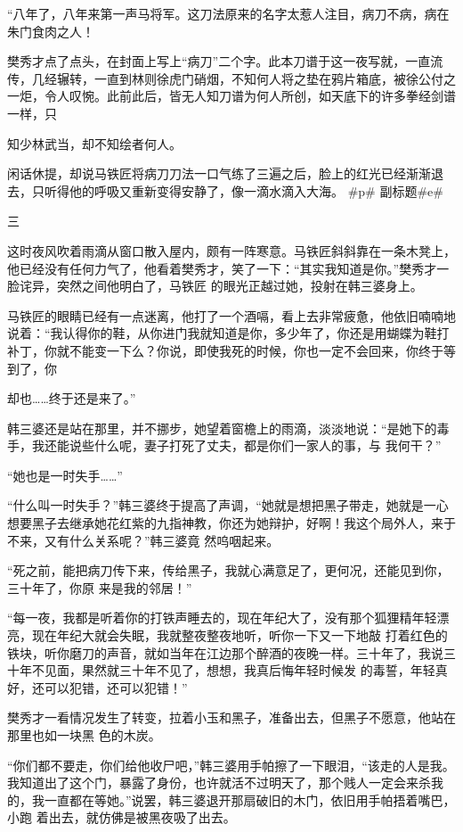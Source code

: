 \documentclass{article}
\begin{document}
“八年了，八年来第一声马将军。这刀法原来的名字太惹人注目，病刀不病，病在朱门食肉之人！

樊秀才点了点头，在封面上写上“病刀”二个字。此本刀谱于这一夜写就，一直流传，几经辗转，一直到林则徐虎门硝烟，不知何人将之垫在鸦片箱底，被徐公付之一炬，令人叹惋。此前此后，皆无人知刀谱为何人所创，如天底下的许多拳经剑谱一样，只
\newpage

知少林武当，却不知绘者何人。 

闲话休提，却说马铁匠将病刀刀法一口气练了三遍之后，脸上的红光已经渐渐退去，只听得他的呼吸又重新变得安静了，像一滴水滴入大海。 #p#
副标题#e# 


三 

这时夜风吹着雨滴从窗口散入屋内，颇有一阵寒意。马铁匠斜斜靠在一条木凳上，他已经没有任何力气了，他看着樊秀才，笑了一下：“其实我知道是你。”樊秀才一脸诧异，突然之间他明白了，马铁匠
的眼光正越过她，投射在韩三婆身上。 

马铁匠的眼睛已经有一点迷离，他打了一个酒嗝，看上去非常疲惫，他依旧喃喃地说着：“我认得你的鞋，从你进门我就知道是你，多少年了，你还是用蝴蝶为鞋打补丁，你就不能变一下么？你说，即使我死的时候，你也一定不会回来，你终于等到了，你

\newpage
却也……终于还是来了。” 

韩三婆还是站在那里，并不挪步，她望着窗檐上的雨滴，淡淡地说：“是她下的毒手，我还能说些什么呢，妻子打死了丈夫，都是你们一家人的事，与
我何干？” 


“她也是一时失手……” 

“什么叫一时失手？”韩三婆终于提高了声调，“她就是想把黑子带走，她就是一心想要黑子去继承她花红紫的九指神教，你还为她辩护，好啊！我这个局外人，来于不来，又有什么关系呢？”韩三婆竟
然呜咽起来。 

“死之前，能把病刀传下来，传给黑子，我就心满意足了，更何况，还能见到你，三十年了，你原
来是我的邻居！” 

“每一夜，我都是听着你的打铁声睡去的，现在年纪大了，没有那个狐狸精年轻漂亮，现在年纪大就会失眠，我就整夜整夜地听，听你一下又一下地敲
\newpage
打着红色的铁块，听你磨刀的声音，就如当年在江边那个醉酒的夜晚一样。三十年了，我说三十年不见面，果然就三十年不见了，想想，我真后悔年轻时候发
的毒誓，年轻真好，还可以犯错，还可以犯错！” 

樊秀才一看情况发生了转变，拉着小玉和黑子，准备出去，但黑子不愿意，他站在那里也如一块黑
色的木炭。 

“你们都不要走，你们给他收尸吧，”韩三婆用手帕擦了一下眼泪，“该走的人是我。我知道出了这个门，暴露了身份，也许就活不过明天了，那个贱人一定会来杀我的，我一直都在等她。”说罢，韩三婆退开那扇破旧的木门，依旧用手帕捂着嘴巴，小跑
着出去，就仿佛是被黑夜吸了出去。 
\end{document}
